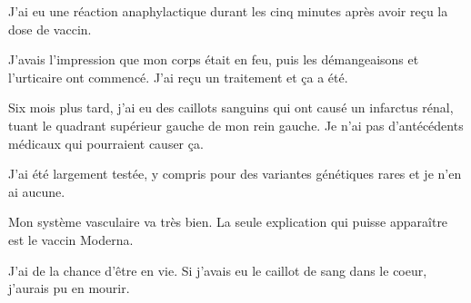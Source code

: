 J'ai eu une réaction anaphylactique durant les cinq minutes après avoir reçu la
dose de vaccin.

J'avais l'impression que mon corps était en feu, puis les démangeaisons et
l'urticaire ont commencé. J'ai reçu un traitement et ça a été.

Six mois plus tard, j'ai eu des caillots sanguins qui ont causé un infarctus
rénal, tuant le quadrant supérieur gauche de mon rein gauche. Je n'ai pas
d'antécédents médicaux qui pourraient causer ça.

J'ai été largement testée, y compris pour des variantes génétiques rares et je
n'en ai aucune.

Mon système vasculaire va très bien. La seule explication qui puisse apparaître
est le vaccin Moderna.

J'ai de la chance d'être en vie. Si j'avais eu le caillot de sang dans le coeur,
j'aurais pu en mourir.


